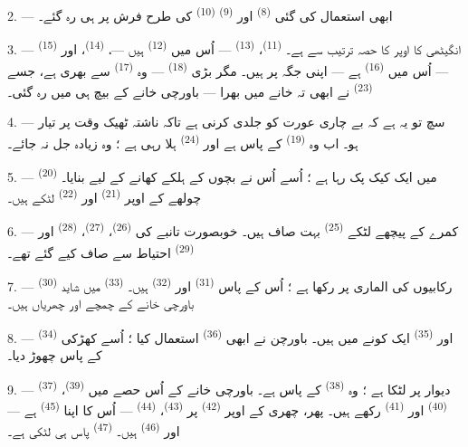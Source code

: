 2. --- ابھی استعمال کی گئی  \textsuperscript{(8)} اور
 \textsuperscript{(9)} 
\textsuperscript{(10)} کی طرح فرش پر ہی رہ گئے۔

3. --- انگیٹھی کا اوپر کا حصہ ترتیب سے ہے۔ 
\textsuperscript{(11)}،  \textsuperscript{(13)} —
اُس میں  \textsuperscript{(12)} ہیں —،
 \textsuperscript{(14)}، اور  \textsuperscript{(15)} — اُس میں 
\textsuperscript{(16)} ہے — اپنی جگہ پر ہیں۔ مگر بڑی  \textsuperscript{(18)} — وہ 
\textsuperscript{(17)} سے بھری ہے، جسے 
\textsuperscript{(23)} نے ابھی تہ خانے میں بھرا — باورچی خانے کے
بیچ ہی میں رہ گئی۔

4. --- سچ تو یہ ہے کہ بے چاری عورت کو جلدی کرنی ہے تاکہ ناشتہ ٹھیک
وقت پر تیار ہو۔ اب وہ  \textsuperscript{(19)} کے پاس ہے
اور  \textsuperscript{(24)} ہلا رہی ہے ؛ وہ زیادہ جل نہ
جائے۔

5. ---  \textsuperscript{(20)} میں ایک کیک پک رہا ہے ؛
اُسے اُس نے بچوں کے ہلکے کھانے کے لیے بنایا۔ چولھے کے اوپر
 \textsuperscript{(21)} اور  \textsuperscript{(22)} لٹکے ہیں۔

\VUsaut{4.0mm}
\VUsaut{3.0mm}

6. --- کمرے کے پیچھے لٹکے 
\textsuperscript{(25)} بہت صاف ہیں۔ خوبصورت تانبے کی 
\textsuperscript{(26)}،  \textsuperscript{(27)}،
 \textsuperscript{(28)} اور 
\textsuperscript{(29)} احتیاط سے صاف کیے گئے تھے۔

7. ---  \textsuperscript{(30)} رکابیوں کی الماری پر
رکھا ہے ؛ اُس کے پاس  \textsuperscript{(31)} اور
 \textsuperscript{(32)} ہیں۔ 
\textsuperscript{(33)} میں شاید باورچی خانے کے چمچے اور چھریاں ہیں۔

8. ---  \textsuperscript{(34)} اور  \textsuperscript{(35)} ایک کونے میں ہیں۔ باورچن نے ابھی
 \textsuperscript{(36)} استعمال کیا ؛ اُسے
کھڑکی کے پاس چھوڑ دیا۔

9. ---  \textsuperscript{(37)} دیوار پر
لٹکا ہے ؛ وہ  \textsuperscript{(38)} کے پاس ہے۔ باورچی
خانے کے اُس حصے میں  \textsuperscript{(39)}،
 \textsuperscript{(40)} اور  \textsuperscript{(41)} رکھے ہیں۔ پھر، چھری کے اوپر
 \textsuperscript{(42)} پر 
\textsuperscript{(43)}،  \textsuperscript{(44)}
— اُس کا اپنا  \textsuperscript{(45)} ہے — اور
 \textsuperscript{(46)} ہیں۔ 
\textsuperscript{(47)} پاس ہی لٹکی ہے۔

